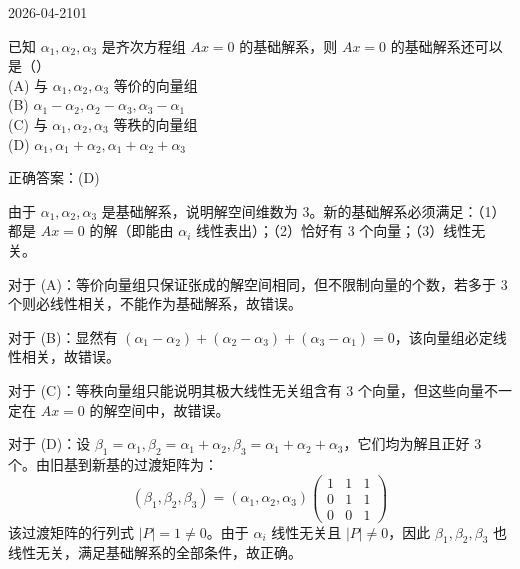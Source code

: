 \begin{mistake}{2026-04-21}{01}

\begin{problemcontent}
已知 \(\alpha_1, \alpha_2, \alpha_3\) 是齐次方程组 \(Ax=0\) 的基础解系，则 \(Ax=0\) 的基础解系还可以是（\quad ）\\
(A) 与 \(\alpha_1, \alpha_2, \alpha_3\) 等价的向量组 \\
(B) \(\alpha_1-\alpha_2, \alpha_2-\alpha_3, \alpha_3-\alpha_1\) \\
(C) 与 \(\alpha_1, \alpha_2, \alpha_3\) 等秩的向量组 \\
(D) \(\alpha_1, \alpha_1+\alpha_2, \alpha_1+\alpha_2+\alpha_3\)
\end{problemcontent}

\begin{solutioncontent}
正确答案：(D)

由于 \(\alpha_1, \alpha_2, \alpha_3\) 是基础解系，说明解空间维数为 3。新的基础解系必须满足：（1）都是 \(Ax=0\) 的解（即能由 \(\alpha_i\) 线性表出）；（2）恰好有 3 个向量；（3）线性无关。

对于 (A)：等价向量组只保证张成的解空间相同，但不限制向量的个数，若多于 3 个则必线性相关，不能作为基础解系，故错误。

对于 (B)：显然有 \((\alpha_1-\alpha_2) + (\alpha_2-\alpha_3) + (\alpha_3-\alpha_1) = 0\)，该向量组必定线性相关，故错误。

对于 (C)：等秩向量组只能说明其极大线性无关组含有 3 个向量，但这些向量不一定在 \(Ax=0\) 的解空间中，故错误。

对于 (D)：设 \(\beta_1=\alpha_1, \beta_2=\alpha_1+\alpha_2, \beta_3=\alpha_1+\alpha_2+\alpha_3\)，它们均为解且正好 3 个。由旧基到新基的过渡矩阵为：
\[
(\beta_1, \beta_2, \beta_3) = (\alpha_1, \alpha_2, \alpha_3) \begin{pmatrix} 1 & 1 & 1 \\ 0 & 1 & 1 \\ 0 & 0 & 1 \end{pmatrix}
\]
该过渡矩阵的行列式 \(|P| = 1 \neq 0\)。由于 \(\alpha_i\) 线性无关且 \(|P| \neq 0\)，因此 \(\beta_1, \beta_2, \beta_3\) 也线性无关，满足基础解系的全部条件，故正确。
\end{solutioncontent}


\end{mistake}
